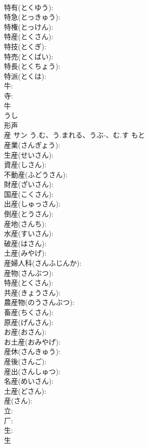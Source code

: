 \documentclass[8pt]{extreport}
\begin{document}
\begin{CJK}{UTF8}{min}
\\	特有(とくゆう): 
\\	特急(とっきゅう): 
\\	特権(とっけん): 
\\	特産(とくさん): 
\\	特技(とくぎ): 
\\	特売(とくばい): 
\\	特長(とくちょう): 
\\	特派(とくは): 
\\	牛: 
\\	寺: 
\\	牛	
\\	うし	
\\	形声 
\\	産	サン	う.む、う.まれる、うぶ-、む.す	もと	
\\	産業(さんぎょう): 
\\	生産(せいさん): 
\\	資産(しさん): 
\\	不動産(ふどうさん): 
\\	財産(ざいさん): 
\\	国産(こくさん): 
\\	出産(しゅっさん): 
\\	倒産(とうさん): 
\\	産地(さんち): 
\\	水産(すいさん): 
\\	破産(はさん): 
\\	土産(みやげ): 
\\	産婦人科(さんふじんか): 
\\	産物(さんぶつ): 
\\	特産(とくさん): 
\\	共産(きょうさん): 
\\	農産物(のうさんぶつ): 
\\	畜産(ちくさん): 
\\	原産(げんさん): 
\\	お産(おさん): 
\\	お土産(おみやげ): 
\\	産休(さんきゅう): 
\\	産後(さんご): 
\\	産出(さんしゅつ): 
\\	名産(めいさん): 
\\	土産(どさん): 
\\	産(さん): 
\\	立: 
\\	厂: 
\\	生: 
\\	生	

\end{CJK}
\end{document}
